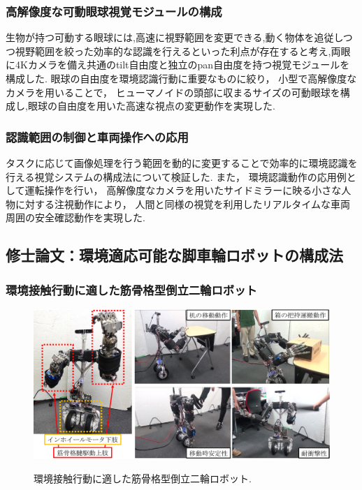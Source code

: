 \documentclass[twocolumn]{d-abst}
\begin{document}
\subsubsection{高解像度な可動眼球視覚モジュールの構成}
生物が持つ可動する眼球には,高速に視野範囲を変更できる,動く物体を追従しつつ視野範囲を絞った効率的な認識を行えるといった利点が存在すると考え,両眼に4Kカメラを備え共通のtilt自由度と独立のpan自由度を持つ視覚モジュールを構成した.
眼球の自由度を環境認識行動に重要なものに絞り， 小型で高解像度なカメラを用いることで， ヒューマノイドの頭部に収まるサイズの可動眼球を構成し,眼球の自由度を用いた高速な視点の変更動作を実現した.

\subsubsection{認識範囲の制御と車両操作への応用}
タスクに応じて画像処理を行う範囲を動的に変更することで効率的に環境認識を行える視覚システムの構成法について検証した.
また， 環境認識動作の応用例として運転操作を行い， 高解像度なカメラを用いたサイドミラーに映る小さな人物に対する注視動作により， 人間と同様の視覚を利用したリアルタイムな車両周囲の安全確認動作を実現した. %

\subsection{修士論文：環境適応可能な脚車輪ロボットの構成法}

\subsubsection{環境接触行動に適した筋骨格型倒立二輪ロボット}

\begin{figure}[tbh]
 \begin{center}
  \begin{minipage}{0.9\columnwidth}
   \includegraphics[width=\columnwidth]{2_twimp.pdf}
   \caption{環境接触行動に適した筋骨格型倒立二輪ロボット.}
  \end{minipage}
  \label{figure:nowprinting}
 \end{center}
\end{figure}
\end{document}

